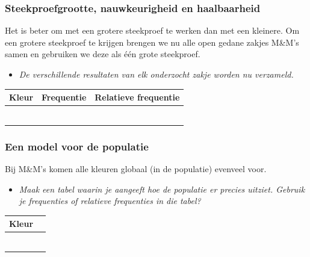 \documentclass[dutch]{beamer}
\newcommand{\vraag}[1]{\begin{itemize}\item {\it #1}\end{itemize}}
\begin{document}
\begin{frame}
\frametitle{Steekproefgrootte, nauwkeurigheid en haalbaarheid}
Het is beter om met een grotere steekproef te werken dan met een kleinere. Om een grotere steekproef te krijgen brengen we nu alle open gedane zakjes M\&M's samen en gebruiken we deze als één grote steekproef.
\vraag{De verschillende resultaten van elk onderzocht zakje worden nu verzameld.}
\begin{center}
  \begin{tabular}{|p{2cm}|p{2cm}|p{2cm}|}
    \hline
    Kleur&Frequentie&Relatieve frequentie\\
    \hline
    &&\vspace*{0pt}\\
    \hline
    &&\vspace*{0pt}\\
    \hline
    &&\vspace*{0pt}\\
    \hline
    &&\vspace*{0pt}\\
    \hline
    &&\vspace*{0pt}\\
    \hline
    &&\vspace*{0pt}\\
    \hline
  \end{tabular}
\end{center}
\end{frame}

\begin{frame}
\frametitle{Een model voor de populatie}
Bij M\&M’s komen alle kleuren globaal (in de populatie) evenveel voor.

\vraag{Maak een tabel waarin je aangeeft hoe de populatie er precies uitziet. Gebruik je frequenties
of relatieve frequenties in die tabel?}
\begin{center}
  \begin{tabular}{|p{2cm}|p{2cm}|}
    \hline
    Kleur&\\
    \hline
    &\vspace*{0pt}\\
    \hline
    &\vspace*{0pt}\\
    \hline
    &\vspace*{0pt}\\
    \hline
    &\vspace*{0pt}\\
    \hline
    &\vspace*{0pt}\\
    \hline
    &\vspace*{0pt}\\
    \hline
  \end{tabular}
\end{center}
\end{frame}
\end{document}
